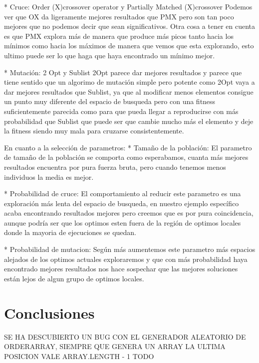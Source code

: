 \documentclass[a4paper,12pt,titlepage]{article}
\begin{document}
 * Cruce: Order (X)crossover operator  y Partially Matched (X)crossover
         Podemos ver que OX da ligeramente mejores resultados que PMX pero son tan poco mejores que no podemos decir que sean significativos. Otra cosa a tener en cuenta es que PMX explora más de manera que produce más picos tanto hacia los mínimos como hacia los máximos de manera que vemos que esta explorando, esto ultimo puede ser lo que haga que haya encontrado un mínimo mejor.

 * Mutación: 2 Opt y Sublist
         2Opt parece dar mejores resultados y parece que tiene sentido que un algorimo de mutación simple pero potente como 2Opt vaya a dar mejores resultados que Sublist, ya que al modificar menos elementos consigue un punto muy diferente del espacio de busqueda pero con una fitness suficientemente parecida como para que pueda llegar a reproducirse con más probabilidad que Sublist que puede ser que cambie mucho más el elemento y deje la fitness siendo muy mala para cruzarse consistentemente.
	 
En cuanto a la selección de parametros:
 * Tamaño de la población:
         El parametro de tamaño de la población se comporta como esperabamos, cuanta más mejores resultados encuentra por pura fuerza bruta, pero cuando tenemos menos individuos la media es mejor.
	 
 * Probabilidad de cruce:
	 El comportamiento al reducir este parametro es una exploración más lenta del espacio de busqueda, en nuestro ejemplo específico acaba encontrando resultados mejores pero creemos que es por pura coincidencia, aunque podría ser que los optimos esten fuera de la región de optimos locales donde la mayoria de ejecuciones se quedan.
	 
 * Probabilidad de mutacion:
	 Según más aumentemos este parametro más espacios alejados de los optimos actuales exploraremos y que con más probabilidad haya encontrado mejores resultados nos hace sospechar que las mejores soluciones están lejos de algun grupo de optimos locales.
	 
	 


\section{Conclusiones}
SE HA DESCUBIERTO UN BUG CON EL GENERADOR ALEATORIO DE ORDERARRAY, SIEMPRE QUE GENERA UN ARRAY LA ULTIMA POSICION VALE ARRAY.LENGTH - 1  
TODO

\newpage


\end{document}
